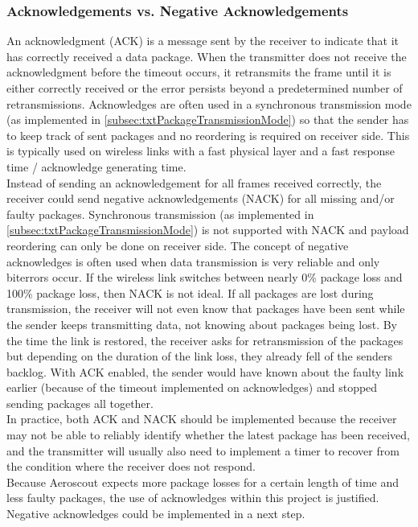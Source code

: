 \subsubsection{Acknowledgements vs. Negative Acknowledgements}
An acknowledgment (ACK) is a message sent by the receiver to indicate that it has correctly received a data package. When the transmitter does not receive the acknowledgment before the timeout occurs, it retransmits the frame until it is either correctly received or the error persists beyond a predetermined number of retransmissions. Acknowledges are often used in a synchronous transmission mode (as implemented in \autoref{subsec:txtPackageTransmissionMode}) so that the sender has to keep track of sent packages and no reordering is required on receiver side. This is typically used on wireless links with a fast physical layer and a fast response time / acknowledge generating time.\\
Instead of sending an acknowledgement for all frames received correctly, the receiver could send negative acknowledgements (NACK) for all missing and/or faulty packages. Synchronous transmission (as implemented in \autoref{subsec:txtPackageTransmissionMode}) is not supported with NACK and payload reordering can only be done on receiver side.  The concept of negative acknowledges is often used when data transmission is very reliable and only biterrors occur. If the wireless link switches between nearly 0\% package loss and 100\% package loss, then NACK is not ideal. If all packages are lost during transmission, the receiver will not even know that packages have been sent while the sender keeps transmitting data, not knowing about packages being lost. By the time the link is restored, the receiver asks for retransmission of the packages but depending on the duration of the link loss, they already fell of the senders backlog. With ACK enabled, the sender would have known about the faulty link earlier (because of the timeout implemented on acknowledges) and stopped sending packages all together.\\
In practice, both ACK and NACK should be implemented because the receiver may not be able to reliably identify whether the latest package has been received, and the transmitter will usually also need to implement a timer to recover from the condition where the receiver does not respond.\\
Because Aeroscout expects more package losses for a certain length of time and less faulty packages, the use of acknowledges within this project is justified. Negative acknowledges could be implemented in a next step.\\
%
